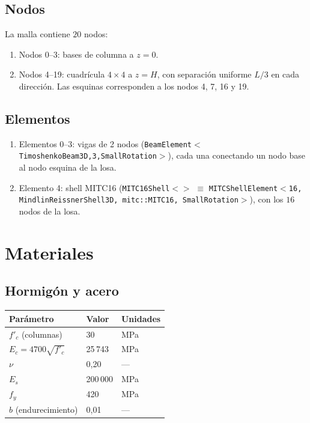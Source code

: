 \subsection{Nodos}

La malla contiene $20$ nodos:
\begin{enumerate}
  \item Nodos 0--3: bases de columna a $z = 0$.
  \item Nodos 4--19: cuadrícula $4 \times 4$ a $z = H$, con separación
        uniforme $L/3$ en cada dirección.  Las esquinas corresponden a
        los nodos 4, 7, 16 y 19.
\end{enumerate}

\subsection{Elementos}

\begin{enumerate}
  \item Elementos 0--3: vigas de 2 nodos (\texttt{BeamElement$<$TimoshenkoBeam3D,3,SmallRotation$>$}),
        cada una conectando un nodo base al nodo esquina de la losa.
  \item Elemento 4: shell MITC16
        (\texttt{MITC16Shell$<>$} $\equiv$ \texttt{MITCShellElement$<$16, MindlinReissnerShell3D, mitc::MITC16, SmallRotation$>$}),
        con los $16$ nodos de la losa.
\end{enumerate}

\section{Materiales}

\subsection{Hormigón y acero}

\begin{center}
\begin{tabular}{lll}
\toprule
Parámetro & Valor & Unidades \\
\midrule
$f'_c$ (columnas)       & 30    & MPa \\
$E_c = 4700\sqrt{f'_c}$ & 25\,743 & MPa \\
$\nu$                    & 0,20  & --- \\
$E_s$                    & 200\,000 & MPa \\
$f_y$                    & 420   & MPa \\
$b$ (endurecimiento)     & 0,01  & --- \\
\bottomrule
\end{tabular}
\end{center}

